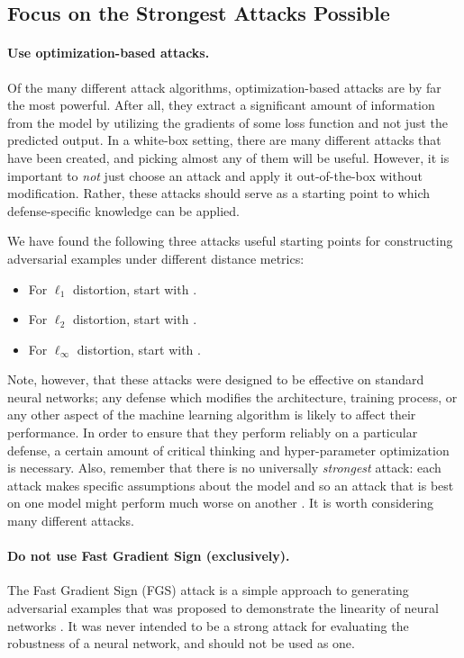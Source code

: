 \documentclass{article} %
\begin{document}
\subsection{Focus on the Strongest Attacks Possible}
\label{sec:whichattack}

\paragraph{Use optimization-based attacks.}
Of the many different attack algorithms, optimization-based attacks
are by far the most powerful.
%
After all, they extract a significant amount of information from the model
by utilizing the gradients of some loss function and not just the predicted output.
%
In a white-box setting, there are many different attacks
that have been created, and picking almost any of them will be useful.
%
However, it is important to \emph{not} just choose an attack and apply it out-of-the-box
without modification.
%
Rather, these attacks should serve as a starting point
to which defense-specific knowledge can be applied.

We have found the following three attacks useful starting points for constructing
adversarial examples under different distance metrics:
\begin{itemize}
  \item For $\ell_1$ distortion, start with \cite{chen2017ead}.
  \item For $\ell_2$ distortion, start with \cite{carlini2017towards}.
  \item For $\ell_\infty$ distortion, start with \cite{madry2017towards}.
\end{itemize}

Note, however, that these attacks were designed to be effective on standard
neural networks; any defense which modifies the architecture, training
process, or any other aspect of the machine learning algorithm is likely to affect their performance.
%
In order to ensure that they perform reliably on a particular defense,
a certain amount of critical thinking and hyper-parameter optimization is necessary.
%
Also, remember that there is
no universally \emph{strongest} attack: each attack makes specific assumptions
about the model and so an attack that is best on one model might perform
much worse on another \citep{schott2018}.
%
It is worth considering many different attacks.

\paragraph{Do not use Fast Gradient Sign (exclusively).}
The Fast Gradient Sign
(FGS) attack is a simple approach to generating adversarial examples
that was proposed to demonstrate the linearity of neural networks \citep{goodfellow2014explaining}.
%
It was never intended to be a strong attack for evaluating the robustness
of a neural network, and should not be used as one.
\end{document}

